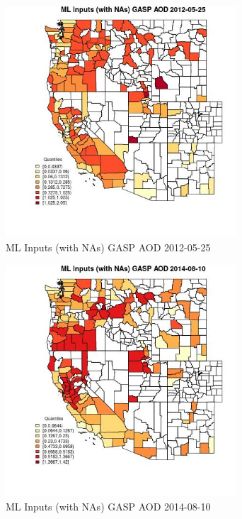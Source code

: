 \begin{figure} 
\centering  
\includegraphics[width=0.77\textwidth]{Code_Outputs/Report_ML_input_PM25_Step4_part_e_de_duplicated_aves_compiled_2019-05-18wNAs_CountyGASP_AODMean2012-05-25_2012-05-25.jpg} 
\caption{\label{fig:Report_ML_input_PM25_Step4_part_e_de_duplicated_aves_compiled_2019-05-18wNAsCountyGASP_AODMean2012-05-25_2012-05-25}ML Inputs (with NAs) GASP AOD 2012-05-25} 
\end{figure} 
 

\begin{figure} 
\centering  
\includegraphics[width=0.77\textwidth]{Code_Outputs/Report_ML_input_PM25_Step4_part_e_de_duplicated_aves_compiled_2019-05-18wNAs_CountyGASP_AODMean2014-08-10_2014-08-10.jpg} 
\caption{\label{fig:Report_ML_input_PM25_Step4_part_e_de_duplicated_aves_compiled_2019-05-18wNAsCountyGASP_AODMean2014-08-10_2014-08-10}ML Inputs (with NAs) GASP AOD 2014-08-10} 
\end{figure} 
 

